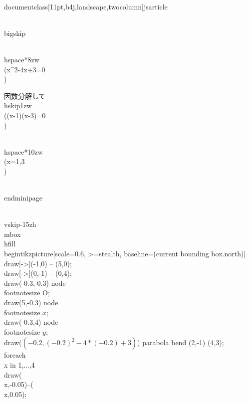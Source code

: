 \\documentclass[11pt,b4j,landscape,twocolumn]{jsarticle}
\begin{document}
\\bigskip

\\hspace*{8zw}\\(x^2-4x+3=0\\)

因数分解して\\hskip1zw \\((x-1)(x-3)=0\\)

\\hspace*{10zw}\\(x=1,3\\)

\\end{minipage}


\\vskip-15zh
\\mbox{}\\hfill
\\begin{tikzpicture}[scale=0.6, >=stealth, baseline=(current bounding box.north)]
\\draw[->](-1,0) -- (5,0);
\\draw[->](0,-1) -- (0,4);
\\draw(-0.3,-0.3) node {\\footnotesize O};
\\draw(5,-0.3) node {\\footnotesize $x$};
\\draw(-0.3,4) node {\\footnotesize $y$};
\\draw($ (-0.2,{(-0.2)^2-4*(-0.2)+3}) $) parabola bend (2,-1) (4,3);
\\foreach \\x in {1,...,4}{\\draw(\\x,-0.05)--(\\x,0.05);}
\end{document}
